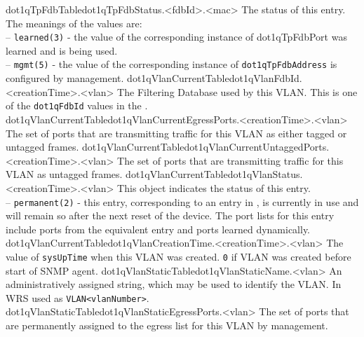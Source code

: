   {dot1qTpFdbTable}{dot1qTpFdbStatus.<fdbId>.<mac>}{
	    The status of this entry.  The meanings of the values
	    are:\\
		-- \texttt{learned(3)} - the value of the corresponding instance
		    of dot1qTpFdbPort was learned and is being used.\\
		-- \texttt{mgmt(5)} - the value of the corresponding instance of
		    \texttt{dot1qTpFdbAddress} is configured by management.}
  {dot1qVlanCurrentTable}{dot1qVlanFdbId.<creationTime>.<vlan>}{
	    The Filtering Database used by this VLAN.  This is one
	    of the \texttt{dot1qFdbId} values in the \texttt{}.}
  {dot1qVlanCurrentTable}{dot1qVlanCurrentEgressPorts.<creationTime>.<vlan>}{
	    The set of ports that are transmitting traffic for
	    this VLAN as either tagged or untagged frames.}
  {dot1qVlanCurrentTable}{dot1qVlanCurrentUntaggedPorts.<creationTime>.<vlan>}{
	    The set of ports that are transmitting traffic for
	    this VLAN as untagged frames.}
  {dot1qVlanCurrentTable}{dot1qVlanStatus.<creationTime>.<vlan>}{
	    This object indicates the status of this entry.\\
	    -- \texttt{permanent(2)} - this entry, corresponding to an entry
		in \texttt{}, is currently in use and
		will remain so after the next reset of the
		device.  The port lists for this entry include
		ports from the equivalent \texttt{}
		entry and ports learned dynamically.}
  {dot1qVlanCurrentTable}{dot1qVlanCreationTime.<creationTime>.<vlan>}{
	    The value of \texttt{sysUpTime} when this VLAN was created.
	    \texttt{0} if VLAN was created before start of SNMP agent.}
  {dot1qVlanStaticTable}{dot1qVlanStaticName.<vlan>}{
	    An administratively assigned string, which may be used
	    to identify the VLAN. In WRS used as \texttt{VLAN<vlanNumber>}.}
  {dot1qVlanStaticTable}{dot1qVlanStaticEgressPorts.<vlan>}{
	    The set of ports that are permanently assigned to the
	    egress list for this VLAN by management.}

